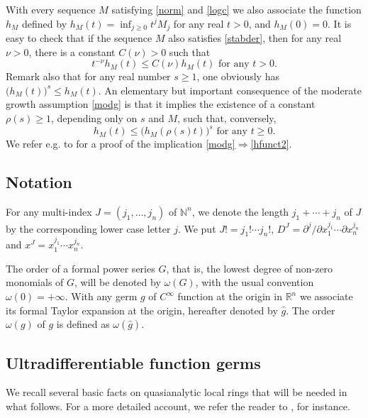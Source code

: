 \documentclass[a4paper]{amsart}
\theoremstyle{plain}
\theoremstyle{remark}
\begin{document}
With every sequence $ M $ satisfying \eqref{norm} and \eqref{logc} we also associate the function $ h_M $ defined by $ h_M(t)=\inf_{j\geq 0}t^jM_j $ for any real $ t>0 $, and $ h_M(0)=0 $. It is easy to 
check that if the sequence $ M $ also satisfies \eqref{stabder}, then for any real $ \nu>0 $, there is a constant $ C(\nu)>0 $ such that
\begin{equation}\label{hfunct1}
t^{-\nu} h_M(t)\leq C(\nu)h_M(t)\textrm{ for any } t>0.
\end{equation}
Remark also 
that for any real number $ s\geq 1 $, one obviously has 
$ \big(h_M(t)\big)^s\leq h_M(t) $. An elementary but important consequence
of the moderate growth assumption \eqref{modg} is that it implies the 
existence of a constant $ \rho(s)\geq 1 $, depending
only on $ s $ and $ M $, such that, conversely,
\begin{equation}\label{hfunct2}
h_M(t)\leq \big(h_M(\rho(s)t)\big)^s\text{ for any }t\geq 0.
\end{equation}
We refer e.g. to \cite{CC1} for a proof of the implication \eqref{modg}$\Rightarrow$\eqref{hfunct2}.

\subsection{Notation} For any multi-index $ J=(j_1,\ldots,j_n) $ of $ \mathbb{N}^n $, we denote the length $ j_1+\cdots+j_n $ of $ J $ by the corresponding lower case letter $ j $. We put $ J!=j_1!\cdots j_n! $,
$ D^J=\partial^j/\partial x_1^{j_1}\cdots\partial x_n^{j_n} $ and $ x^J=x_1^{j_1}\cdots x_n^{j_n} $. 

The order of a formal power series $ G $, that is, the lowest degree of non-zero monomials of $G $, will be denoted by $ \omega(G) $, with the usual convention $ \omega(0)=+\infty $. With any germ $ g $ of $ C^\infty $ function at the origin in $ \mathbb{R}^n $ we associate its formal Taylor expansion at the origin, hereafter denoted by $ \widehat{g} $. The order $ \omega(g) $ of $ g $ is defined as $ \omega(\widehat{g}) $.

\subsection{Ultradifferentiable function germs}\label{udg}

We recall several basic facts on quasianalytic local rings that will be needed in what follows. For a more detailed account, we refer the reader to \cite{Th}, for instance.
\end{document}
